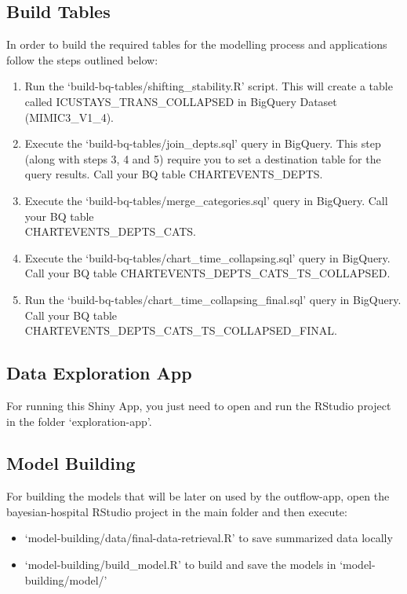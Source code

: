 \documentclass[12pt]{article}
\begin{document}
\subsection*{Build Tables}

In order to build the required tables for the modelling process and applications follow the steps outlined below: 
\begin{enumerate}
	\item  Run the `build-bq-tables/shifting\_stability.R' script. This will create a table called ICUSTAYS\_TRANS\_COLLAPSED in BigQuery Dataset (MIMIC3\_V1\_4).
	\item Execute the `build-bq-tables/join\_depts.sql' query in BigQuery. This step (along with steps 3, 4 and 5) require you to set a destination table for the query results. Call your BQ table CHARTEVENTS\_DEPTS.
	\item  Execute the `build-bq-tables/merge\_categories.sql' query in BigQuery. Call your BQ table \\ CHARTEVENTS\_DEPTS\_CATS.
	\item  Execute the `build-bq-tables/chart\_time\_collapsing.sql'  query in BigQuery. Call your BQ table CHARTEVENTS\_DEPTS\_CATS\_TS\_COLLAPSED.
	\item  Run the `build-bq-tables/chart\_time\_collapsing\_final.sql' query in BigQuery. Call your BQ table CHARTEVENTS\_DEPTS\_CATS\_TS\_COLLAPSED\_FINAL.
\end{enumerate} 


\subsection*{Data Exploration App}

For running this Shiny App, you just need to open and run the RStudio project in the folder `exploration-app'.

\subsection*{Model Building}

For building the models that will be later on used by the outflow-app, open the bayesian-hospital RStudio project in the main folder and then execute:

\begin{itemize}
	\item `model-building/data/final-data-retrieval.R' to save summarized data locally 
	\item `model-building/build\_model.R' to build and save the models in `model-building/model/'
\end{itemize} 
\end{document}
